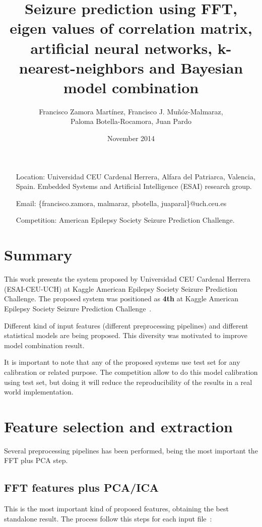 \documentclass[a4paper,english,twoside]{article}
\author{Francisco Zamora Martínez, Francisco J. Mu\~n\'oz-Malmaraz,\\
  Paloma Botella-Rocamora, Juan Pardo}
\date{November 2014}
\title{Seizure prediction using FFT, eigen values of correlation matrix,
  artificial neural networks, k-nearest-neighbors and Bayesian model combination}
\begin{document}
\maketitle

\begin{itemize}
\item[Location:] Universidad CEU Cardenal Herrera, Alfara del Patriarca,
  Valencia, Spain. Embedded Systems and Artificial Intelligence (ESAI) research
  group.
\item[Email:] \{francisco.zamora, malmaraz, pbotella, juaparal\}@uch.ceu.es
\item[Competition:] American Epilepsy Society Seizure Prediction Challenge.
\end{itemize}

\section{Summary}\label{summary}

This work presents the system proposed by Universidad CEU Cardenal
Herrera (ESAI-CEU-UCH) at Kaggle American Epilepsy Society Seizure
Prediction Challenge. The proposed system was positioned as \textbf{4th}
at Kaggle American Epilepsy Society Seizure Prediction Challenge~\cite{kaggle}.

Different kind of input features (different preprocessing pipelines) and
different statistical models are being proposed. This diversity was motivated to
improve model combination result.

It is important to note that any of the proposed systems use test set
for any calibration or related purpose. The competition allow to do this
model calibration using test set, but doing it will reduce the
reproducibility of the results in a real world implementation.

\section{Feature selection and
  extraction}\label{feature-selection-and-extraction}

Several preprocessing pipelines has been performed, being the most
important the FFT plus PCA step.

\subsection{FFT features plus PCA/ICA}\label{fft-features-plus-pcaica}

This is the most important kind of proposed features, obtaining the best
standalone result. The process follow this steps for each input
file~\cite{2014:howbert:plosone}:
\end{document}
